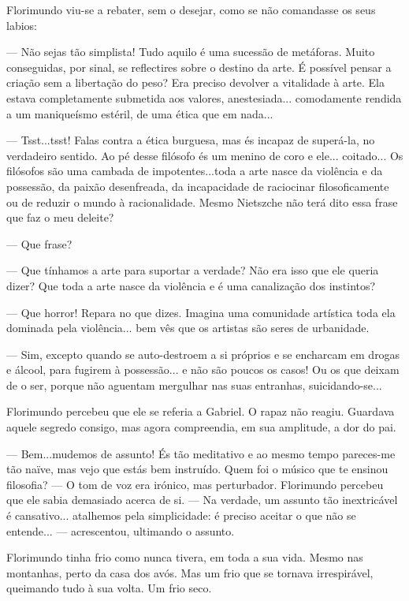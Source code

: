 Florimundo viu-se a rebater, sem o desejar, como se não comandasse os
seus labios:

--- Não sejas tão simplista! Tudo aquilo é uma sucessão de metáforas.
Muito conseguidas, por sinal, se reflectires sobre o destino da arte. É
possível pensar a criação sem a libertação do peso? Era preciso devolver
a vitalidade à arte. Ela estava completamente submetida aos valores,
anestesiada... comodamente rendida a um maniqueísmo estéril, de uma
ética que em nada...

--- Tsst...tsst! Falas contra a ética burguesa, mas és incapaz de
superá-la, no verdadeiro sentido. Ao pé desse filósofo és um menino de
coro e ele... coitado... Os filósofos são uma cambada de
impotentes...toda a arte nasce da violência e da possessão, da paixão
desenfreada, da incapacidade de raciocinar filosoficamente ou de reduzir
o mundo à racionalidade. Mesmo Nietszche não terá dito essa frase que
faz o meu deleite?

--- Que frase?

--- Que tínhamos a arte para suportar a verdade? Não era isso que ele
queria dizer? Que toda a arte nasce da violência e é uma canalização dos
instintos?

--- Que horror! Repara no que dizes. Imagina uma comunidade artística toda
ela dominada pela violência... bem vês que os artistas são seres de
urbanidade.

--- Sim, excepto quando se auto-destroem a si próprios e se encharcam em
drogas e álcool, para fugirem à possessão... e não são poucos os casos!
Ou os que deixam de o ser, porque não aguentam mergulhar nas suas
entranhas, suicidando-se...

Florimundo percebeu que ele se referia a Gabriel. O rapaz não reagiu.
Guardava aquele segredo consigo, mas agora compreendia, em sua
amplitude, a dor do pai.

--- Bem...mudemos de assunto! És tão meditativo e ao mesmo tempo
pareces-me tão naïve, mas vejo que estás bem instruído. Quem foi o
músico que te ensinou filosofia? --- O tom de voz era irónico, mas
perturbador. Florimundo percebeu que ele sabia demasiado acerca de si. ---
Na verdade, um assunto tão inextricável é cansativo... atalhemos pela
simplicidade: é preciso aceitar o que não se entende... --- acrescentou,
ultimando o assunto.

Florimundo tinha frio como nunca tivera, em toda a sua vida. Mesmo nas
montanhas, perto da casa dos avós. Mas um frio que se tornava
irrespirável, queimando tudo à sua volta. Um frio seco.

